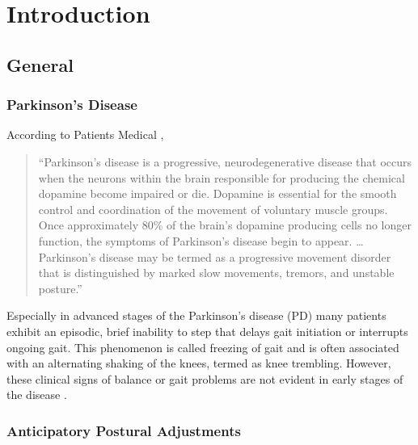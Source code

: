 \chapter{Introduction}
\label{ch:Introduction}

\section{General}

\subsection{Parkinson's Disease}

According to Patients Medical \cite{patients_medical_definition_2014}, \begin{quote}``Parkinson's disease is a progressive, neurodegenerative disease that occurs when the neurons within the brain responsible for producing the chemical dopamine become impaired or die. Dopamine is essential for the smooth control and coordination of the movement of voluntary muscle groups. Once approximately 80\% of the brain's dopamine producing cells no longer function, the symptoms of Parkinson's disease begin to appear. \dots Parkinson's disease may be termed as a progressive movement disorder that is distinguished by marked slow movements, tremors, and unstable posture.''\end{quote}

Especially in advanced stages of the Parkinson's disease (PD) many patients exhibit an episodic, brief inability to step that delays gait initiation or interrupts ongoing gait. This phenomenon is called freezing of gait and is often associated with an alternating shaking of the knees, termed as knee trembling. However, these clinical signs of balance or gait problems are not evident in early stages of the disease \cite{mancini_anticipatory_2009}\cite{jacobs_knee_2009}.

\subsection{Anticipatory Postural Adjustments}

